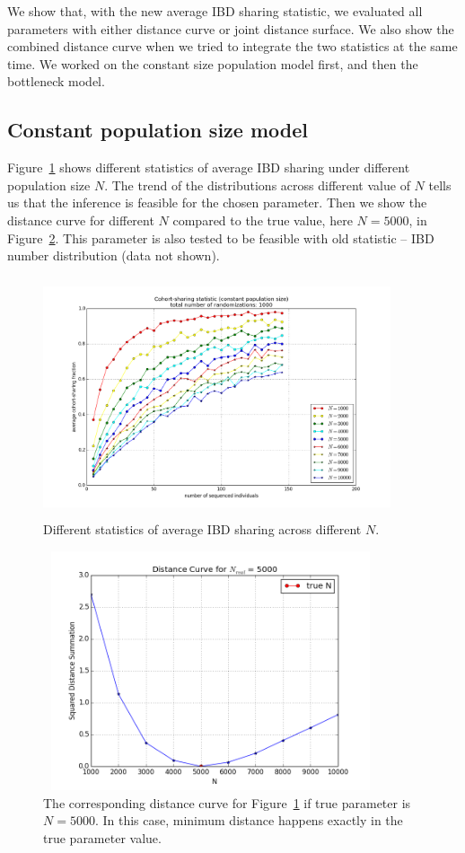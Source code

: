 \documentclass{bioinfo}
\begin{document}
We show that, with the new average IBD sharing statistic, we evaluated all parameters with either distance curve or joint distance surface. We also show the combined distance curve when we tried to integrate the two statistics at the same time. We worked on the constant size population model first, and then the bottleneck model.

\subsection{Constant population size model}

Figure~\ref{fig:dis_N} shows different statistics of average IBD sharing under different population size $N$. The trend of the distributions across different value of $N$ tells us that the inference is feasible for the chosen parameter. Then we show the distance curve for different $N$ compared to the true value, here $N=5000$, in Figure~\ref{fig:like_N}. This parameter is also tested to be feasible with old statistic -- IBD number distribution (data not shown).

\begin{figure}[h]
\centerline{\includegraphics[width=290pt, height=200pt]{dis_N.png}}
\caption{Different statistics of average IBD sharing across different $N$.}\label{fig:dis_N}
\end{figure}

\begin{figure}[h]
\centerline{\includegraphics[width=280pt, height=200pt]{like_N.png}}
\caption{The corresponding distance curve for Figure~\protect\ref{fig:dis_N} if true parameter is $N=5000$. In this case, minimum distance happens exactly in the true parameter value.}\label{fig:like_N}
\end{figure}
\end{document}
